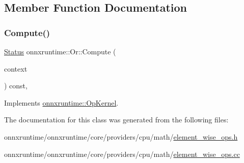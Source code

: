 \subsection{Member Function Documentation}
\mbox{\label{classonnxruntime_1_1Or_af4b545cf032db5924efe3f2bbb2803d5}} 
\subsubsection{\texorpdfstring{Compute()}{Compute()}}
{\footnotesize\ttfamily \mbox{\hyperlink{classonnxruntime_1_1common_1_1Status}{Status}} onnxruntime\+::\+Or\+::\+Compute (\begin{DoxyParamCaption}\item[{\mbox{\hyperlink{classonnxruntime_1_1OpKernelContext}{Op\+Kernel\+Context}} $\ast$}]{context }\end{DoxyParamCaption}) const\hspace{0.3cm}{\ttfamily [override]}, {\ttfamily [virtual]}}



Implements \mbox{\hyperlink{classonnxruntime_1_1OpKernel_a9eca8656a78b1b3ab9d3351a12798650}{onnxruntime\+::\+Op\+Kernel}}.



The documentation for this class was generated from the following files\+:\begin{DoxyCompactItemize}
\item 
onnxruntime/onnxruntime/core/providers/cpu/math/\mbox{\hyperlink{element__wise__ops_8h}{element\+\_\+wise\+\_\+ops.\+h}}\item 
onnxruntime/onnxruntime/core/providers/cpu/math/\mbox{\hyperlink{element__wise__ops_8cc}{element\+\_\+wise\+\_\+ops.\+cc}}\end{DoxyCompactItemize}
